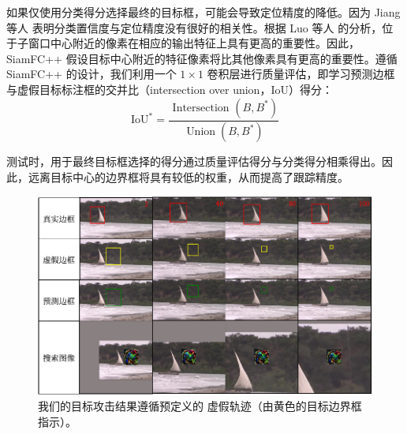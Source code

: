 如果仅使用分类得分选择最终的目标框，可能会导致定位精度的降低。因为 Jiang 等人 \cite{IoU-Net} 表明分类置信度与定位精度没有很好的相关性。根据 Luo 等人 \cite{ERF} 的分析，位于子窗口中心附近的像素在相应的输出特征上具有更高的重要性。因此，SiamFC++ 假设目标中心附近的特征像素将比其他像素具有更高的重要性。遵循 SiamFC++ 的设计，我们利用一个 $1 \times 1$ 卷积层进行质量评估，即学习预测边框与虚假目标标注框的交并比（intersection over union，IoU）得分：
\begin{equation}
\mathrm{IoU}^{*}=\frac{\text { Intersection }\left(B, B^{*}\right)}{\operatorname{Union}\left(B, B^{*}\right)}
\end{equation}

测试时，用于最终目标框选择的得分通过质量评估得分与分类得分相乘得出。因此，远离目标中心的边界框将具有较低的权重，从而提高了跟踪精度。

\begin{figure}[t]
\centering
\includegraphics[width=1.0\textwidth]{Img/attack/vis_v4.pdf}
\caption{我们的目标攻击结果遵循预定义的 虚假轨迹（由黄色的目标边界框指示）。}
\label{fig:attack_vis}
\end{figure}


